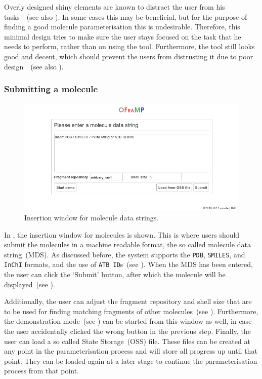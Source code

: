 Overly designed shiny elements are known to distract the user from his tasks~\cite{norman1990interfaces}~(see also ). In some cases this may be beneficial, but for the purpose of finding a good molecule parameterisation this is undesirable. Therefore, this minimal design tries to make sure the user stays focused on the task that he needs to perform, rather than on using the tool. Furthermore, the tool still looks good and decent, which should prevent the users from distrusting it due to poor design~\cite{norman2002emotion}~(see also ).

\subsubsection{Submitting a molecule}

\begin{figure}
\center
\includegraphics[width=.9\textwidth]{img/impl_inserting.png}
\caption{Insertion window for molecule data strings.}
\end{figure}

In , the insertion window for molecules is shown. This is where users should submit the molecules in a machine readable format, the so called molecule data string~(MDS). As discussed before, the system supports the \verb|PDB|, \verb|SMILES|, and \verb|InChI| formats, and the use of \verb|ATB ID|s~(see ). When the MDS has been entered, the user can click the `Submit' button, after which the molecule will be displayed~(see ).

Additionally, the user can adjust the fragment repository and shell size that are to be used for finding matching fragments of other molecules~(see ). Furthermore, the demonstration mode~(see ) can be started from this window as well, in case the user accidentally clicked the wrong button in the previous step. Finally, the user can load a so called \oframp{} State Storage~(OSS) file. These files can be created at any point in the parameterisation process and will store all progress up until that point. They can be loaded again at a later stage to continue the parameterisation process from that point.


